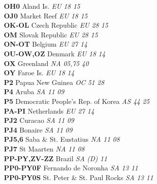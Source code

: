 ﻿\documentclass[landscape,a4paper]{article}
\begin{document}
\begin{multicols}{6}
\textbf{OH0                     } Aland Is.                          \emph{ EU     18     15    } \\
\textbf{OJ0                     } Market Reef                        \emph{ EU     18     15    } \\
\textbf{OK-OL                   } Czech Republic                     \emph{ EU     28     15    } \\
\textbf{OM                      } Slovak Republic                    \emph{ EU     28     15    } \\
\textbf{ON-OT                   } Belgium                            \emph{ EU     27     14    } \\
\textbf{OU-OW,OZ                } Denmark                            \emph{ EU     18     14    } \\
\textbf{OX                      } Greenland                          \emph{ NA     05,75  40    } \\
\textbf{OY                      } Faroe Is.                          \emph{ EU     18     14    } \\
\textbf{P2                      } Papua New Guinea                   \emph{ OC     51     28    } \\
\textbf{P4                      } Aruba                              \emph{ SA     11     09    } \\
\textbf{P5                      } Democratic People's Rep. of Korea  \emph{ AS     44     25    } \\
\textbf{PA-PI                   } Netherlands                        \emph{ EU     27     14    } \\
\textbf{PJ2                     } Curacao                            \emph{ SA     11     09    } \\
\textbf{PJ4                     } Bonaire                            \emph{ SA     11     09    } \\
\textbf{PJ5,6                   } Saba \& St. Eustatius              \emph{ NA     11     08    } \\
\textbf{PJ7                     } St Maarten                         \emph{ NA     11     08    } \\
\textbf{PP-PY,ZV-ZZ             } Brazil                             \emph{ SA     (D)    11    } \\
\textbf{PP0-PY0F                } Fernando de Noronha                \emph{ SA     13     11    } \\
\textbf{PP0-PY0S                } St. Peter \& St. Paul Rocks        \emph{ SA     13     11    } \\

\end{multicols}
\end{document}
